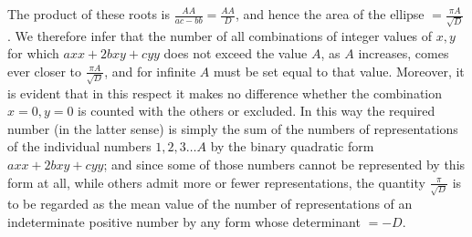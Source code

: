 The product of these roots is $\frac{AA}{ac-bb}=\frac{AA}D$, and hence the area of the ellipse $=\frac{\pi A}{\surd D}$. We therefore infer that the number of all combinations of integer values of $x,y$ for which $axx+2bxy+cyy$ does not exceed the value $A$, as $A$ increases, comes ever closer to $\frac{\pi A}{\surd D}$, and for infinite $A$ must be set equal to that value. Moreover, it is evident that in this respect it makes no difference whether the combination $x=0,y=0$ is counted with the others or excluded. In this way the required number (in the latter sense) is simply the sum of the numbers of representations of the individual numbers $1,2,3\ldots A$ by the binary quadratic form $axx+2bxy+cyy$; and since some of those numbers cannot be represented by this form at all, while others admit more or fewer representations, the quantity $\frac\pi{\surd D}$ is to be regarded as the mean value of the number of representations of an indeterminate positive number by any form whose determinant $=-D$.
